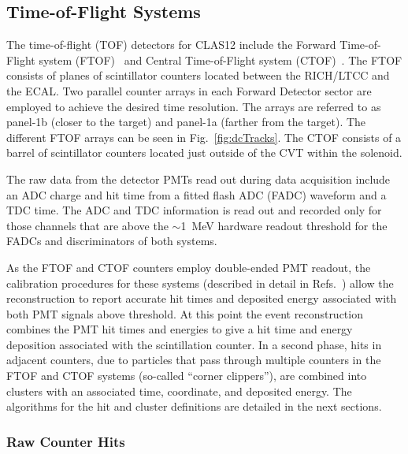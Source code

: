 \subsection{Time-of-Flight Systems}
\label{tof-sys}

The time-of-flight (TOF) detectors for CLAS12 include the Forward Time-of-Flight system (FTOF)~\cite{ftof-nim}
and Central Time-of-Flight system (CTOF)~\cite{ctof-nim}. The FTOF consists of planes of scintillator counters
located between the RICH/LTCC and the ECAL. Two parallel counter arrays in each Forward Detector sector are
employed to achieve the desired time resolution. The arrays are referred to as panel-1b (closer to the target) and
panel-1a (farther from the target). The different FTOF arrays can be seen in Fig.~\ref{fig:dcTracks}. The CTOF
consists of a barrel of scintillator counters located just outside of the CVT within the solenoid.

The raw data from the detector PMTs read out during data acquisition include an ADC charge and hit time from a
fitted flash ADC (FADC) waveform and a TDC time. The ADC and TDC information is read out and recorded only for
those channels that are above the $\sim$1~MeV hardware readout threshold for the FADCs and discriminators of
both systems. 

As the FTOF and CTOF counters employ double-ended PMT readout, the calibration procedures for these
systems (described in detail in Refs.~\cite{ftof-nim,ctof-nim}) allow the reconstruction to report accurate hit
times and deposited energy associated with both PMT signals above threshold. At this point the event reconstruction
combines the PMT hit times and energies to give a hit time and energy deposition associated with the scintillation
counter. In a second phase, hits in adjacent counters, due to particles that pass through multiple counters in the
FTOF and CTOF systems (so-called ``corner clippers''), are combined into clusters with an associated time,
coordinate, and deposited energy. The algorithms for the hit and cluster definitions are detailed in the next sections.

\subsubsection{Raw Counter Hits}

